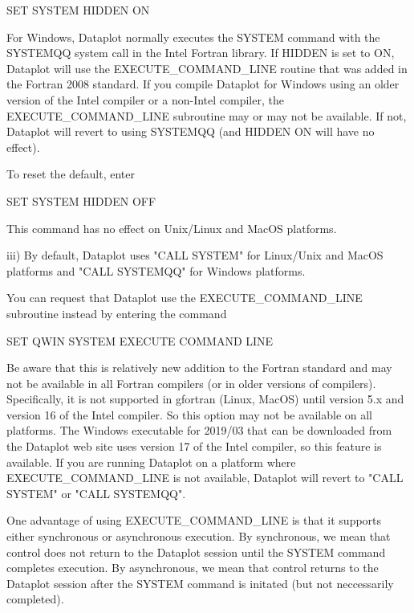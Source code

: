               SET SYSTEM HIDDEN ON

         For Windows, Dataplot normally executes the SYSTEM command with
         the SYSTEMQQ system call in the Intel Fortran library.  If
         HIDDEN is set to ON, Dataplot will use the EXECUTE_COMMAND_LINE
         routine that was added in the Fortran 2008 standard.  If you
         compile Dataplot for Windows using an older version of the Intel
         compiler or a non-Intel compiler, the EXECUTE_COMMAND_LINE
         subroutine may or may not be available.  If not, Dataplot will
         revert to using SYSTEMQQ (and HIDDEN ON will have no effect).

         To reset the default, enter

              SET SYSTEM HIDDEN OFF

         This command has no effect on Unix/Linux and MacOS platforms.

    iii) By default, Dataplot uses "CALL SYSTEM" for Linux/Unix and
         MacOS platforms and "CALL SYSTEMQQ" for Windows platforms.

         You can request that Dataplot use the EXECUTE_COMMAND_LINE
         subroutine instead by entering the command

              SET QWIN SYSTEM EXECUTE COMMAND LINE

         Be aware that this is relatively new addition to the Fortran
         standard and may not be available in all Fortran compilers (or
         in older versions of compilers).  Specifically, it is not
         supported in gfortran (Linux, MacOS) until version 5.x and
         version 16 of the Intel compiler.  So this option may not be
         available on all platforms.  The Windows executable for 2019/03
         that can be downloaded from the Dataplot web site uses version 17
         of the Intel compiler, so this feature is available.  If you are
         running Dataplot on a platform where EXECUTE_COMMAND_LINE is not
         available, Dataplot will revert to "CALL SYSTEM" or
         "CALL SYSTEMQQ".

         One advantage of using EXECUTE_COMMAND_LINE is that it supports
         either synchronous or asynchronous execution.  By synchronous, we
         mean that control does not return to the Dataplot session until
         the SYSTEM command completes execution.  By asynchronous, we
         mean that control returns to the Dataplot session after the
         SYSTEM command is initated (but not neccessarily completed).

